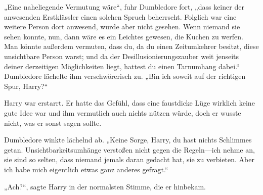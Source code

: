 „Eine naheliegende Vermutung wäre“, fuhr Dumbledore fort, „dass keiner der anwesenden Erstklässler einen solchen Spruch beherrscht. Folglich war eine weitere Person dort anwesend, wurde aber nicht gesehen. Wenn niemand sie sehen konnte, nun, dann wäre es ein Leichtes gewesen, die Kuchen zu werfen. Man könnte außerdem vermuten, dass du, da du einen Zeitumkehrer besitzt, diese unsichtbare Person warst; und da der Desillusionierungszauber weit jenseits deiner derzeitigen Möglichkeiten liegt, hattest du einen Tarnumhang dabei.“ Dumbledore lächelte ihm verschwörerisch zu. „Bin ich soweit auf der richtigen Spur, Harry?“

Harry war erstarrt. Er hatte das Gefühl, dass eine faustdicke Lüge wirklich keine gute Idee war und ihm vermutlich auch nichts nützen würde, doch er wusste nicht, was er sonst sagen sollte.

Dumbledore winkte lächelnd ab. „Keine Sorge, Harry, du hast nichts Schlimmes getan. Unsichtbarkeitsumhänge verstoßen nicht gegen die Regeln—ich nehme an, sie sind so selten, dass niemand jemals daran gedacht hat, sie zu verbieten. Aber ich habe mich eigentlich etwas ganz anderes gefragt.“

„Ach?“, sagte Harry in der normalsten Stimme, die er hinbekam.

